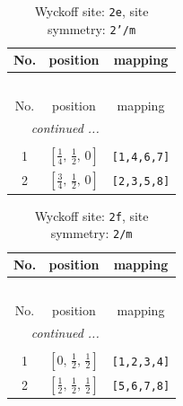 \documentclass[fleqn,8pt]{jsarticle}
\begin{document}
\begin{longtable}{ccc}
\caption{Wyckoff site: {\tt 2e}, site symmetry: {\tt 2'/m}}
 \\
 \hline \hline
No. & position & mapping \\ \hline \endfirsthead

\multicolumn{2}{l}{\tablename\ \thetable{}} \\
 \hline \hline
No. & position & mapping \\ \hline \endhead

 \hline \hline
\multicolumn{2}{r}{\footnotesize\it continued ...} \\ \endfoot

 \hline \hline
\multicolumn{2}{r}{} \\ \endlastfoot

1 & $\left[ \frac{1}{4},\, \frac{1}{2},\, 0 \right]$ & {\tt [1,4,6,7]} \\ \hline
2 & $\left[ \frac{3}{4},\, \frac{1}{2},\, 0 \right]$ & {\tt [2,3,5,8]} \\
\end{longtable}
\renewcommand{\arraystretch}{1.2}
\begin{longtable}{ccc}
\caption{Wyckoff site: {\tt 2f}, site symmetry: {\tt 2/m}}
 \\
 \hline \hline
No. & position & mapping \\ \hline \endfirsthead

\multicolumn{2}{l}{\tablename\ \thetable{}} \\
 \hline \hline
No. & position & mapping \\ \hline \endhead

 \hline \hline
\multicolumn{2}{r}{\footnotesize\it continued ...} \\ \endfoot

 \hline \hline
\multicolumn{2}{r}{} \\ \endlastfoot

1 & $\left[ 0,\, \frac{1}{2},\, \frac{1}{2} \right]$ & {\tt [1,2,3,4]} \\ \hline
2 & $\left[ \frac{1}{2},\, \frac{1}{2},\, \frac{1}{2} \right]$ & {\tt [5,6,7,8]} \\
\end{longtable}
\renewcommand{\arraystretch}{1.2}
\end{document}
